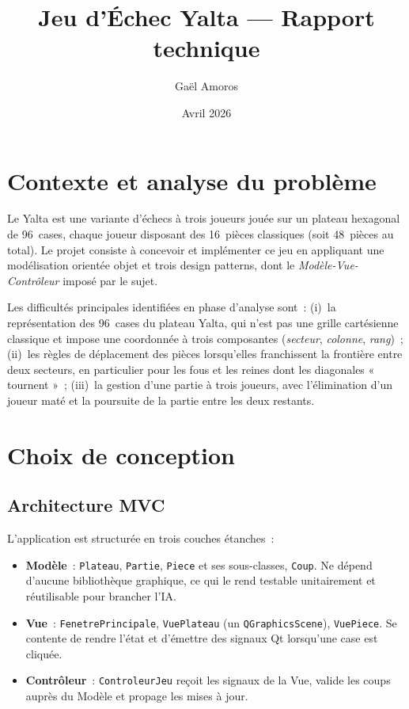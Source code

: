 \documentclass[11pt,a4paper]{article}
\title{\vspace{-1.5cm}Jeu d'\'Echec Yalta --- Rapport technique}
\author{Gaël Amoros}
\date{Avril 2026}
\begin{document}
\maketitle
\vspace{-0.8cm}

\section{Contexte et analyse du problème}

Le Yalta est une variante d'échecs à trois joueurs jouée sur un plateau hexagonal de
96~cases, chaque joueur disposant des 16~pièces classiques (soit 48~pièces au total).
Le projet consiste à concevoir et implémenter ce jeu en appliquant une
modélisation orientée objet et trois design patterns, dont le
\emph{Modèle-Vue-Contrôleur} imposé par le sujet.

Les difficultés principales identifiées en phase d'analyse sont~: (i)~la
représentation des 96~cases du plateau Yalta, qui n'est pas une grille cartésienne
classique et impose une coordonnée à trois composantes (\emph{secteur},
\emph{colonne}, \emph{rang})~; (ii)~les règles de déplacement des pièces lorsqu'elles
franchissent la frontière entre deux secteurs, en particulier pour les fous et les
reines dont les diagonales « tournent »~; (iii)~la gestion d'une partie à trois
joueurs, avec l'élimination d'un joueur maté et la poursuite de la partie entre les
deux restants.

\section{Choix de conception}

\subsection{Architecture MVC}

L'application est structurée en trois couches étanches~:
\begin{itemize}
    \item \textbf{Modèle}~: \texttt{Plateau}, \texttt{Partie}, \texttt{Piece} et ses
    sous-classes, \texttt{Coup}. Ne dépend d'aucune bibliothèque graphique, ce qui
    le rend testable unitairement et réutilisable pour brancher l'IA.
    \item \textbf{Vue}~: \texttt{FenetrePrincipale}, \texttt{VuePlateau} (un
    \texttt{QGraphicsScene}), \texttt{VuePiece}. Se contente de rendre l'état et
    d'émettre des signaux Qt lorsqu'une case est cliquée.
    \item \textbf{Contrôleur}~: \texttt{ControleurJeu} reçoit les signaux de la Vue,
    valide les coups auprès du Modèle et propage les mises à jour.
\end{itemize}
\end{document}
